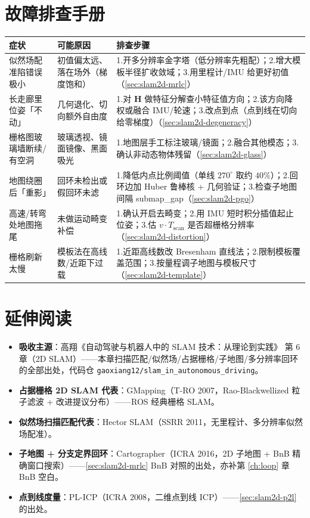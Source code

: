 \section*{故障排查手册}
\begin{table}[H]\centering\small
\begin{tabular}{p{} p{} p{}}
\toprule
症状 & 可能原因 & 排查步骤 \\
\midrule
似然场配准陷错误极小 & 初值偏太远、落在场外（梯度饱和） & 1.开多分辨率金字塔（低分辨率先粗配）；2.增大模板半径扩收敛域；3.用里程计/IMU 给更好初值（\cref{sec:slam2d-mrlc}）\\
长走廊里位姿「不动」 & 几何退化、切向额外自由度 & 1.对 $\mathbf{H}$ 做特征分解查小特征值方向；2.该方向降权或融合 IMU/轮速；3.改点到点（点到线在切向给零梯度）（\cref{sec:slam2d-degeneracy}）\\
栅格图玻璃墙断续/有空洞 & 玻璃透视、镜面镜像、黑面吸光 & 1.地图层手工标注玻璃/镜面；2.融合其他模态；3.确认非动态物体残留（\cref{sec:slam2d-glass}）\\
地图绕圈后「重影」 & 回环未检出或假回环未滤 & 1.降低内点比例阈值（单线 $270^\circ$ 取约 $40\%$）；2.回环边加 Huber 鲁棒核 + 几何验证；3.检查子地图间隔 submap\_gap（\cref{sec:slam2d-pgo}）\\
高速/转弯处地图拖尾 & 未做运动畸变补偿 & 1.确认开启去畸变；2.用 IMU 短时积分插值起止位姿；3.估 $v\cdot T_{\text{scan}}$ 是否超栅格分辨率（\cref{sec:slam2d-distortion}）\\
栅格刷新太慢 & 模板法在高线数/近距下过载 & 1.近距高线数改 Bresenham 直线法；2.限制模板覆盖范围；3.按量程调子地图与模板尺寸（\cref{sec:slam2d-template}）\\
\bottomrule
\end{tabular}
\end{table}

\section*{延伸阅读}
\begin{itemize}
  \item \textbf{吸收主源}：高翔《自动驾驶与机器人中的 SLAM 技术：从理论到实践》\cite{gao2023slamad} 第 6 章（2D SLAM）——本章扫描匹配/似然场/占据栅格/子地图/多分辨率回环的全部出处，代码仓 \texttt{gaoxiang12/slam\_in\_autonomous\_driving}。
  \item \textbf{占据栅格 2D SLAM 代表}：GMapping\cite{grisetti2007gmapping}（T-RO 2007，Rao-Blackwellized 粒子滤波 + 改进提议分布）——ROS 经典栅格 SLAM。
  \item \textbf{似然场扫描匹配代表}：Hector SLAM\cite{kohlbrecher2011hector}（SSRR 2011，无里程计、多分辨率似然场配准）。
  \item \textbf{子地图 + 分支定界回环}：Cartographer\cite{hess2016cartographer}（ICRA 2016，2D 子地图 + BnB 精确窗口搜索）——\cref{sec:slam2d-mrlc} BnB 对照的出处，亦补第 \cref{ch:loop} 章 BnB 空白。
  \item \textbf{点到线度量}：PL-ICP\cite{censi2008plicp}（ICRA 2008，二维点到线 ICP）——\cref{sec:slam2d-p2l} 的出处。
\end{itemize}

